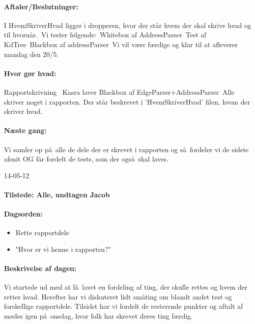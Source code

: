 \documentclass[a4paper,10pt,titlepage]{article}
\begin{document}
		\paragraph{Aftaler/Beslutninger:}
		I HvemSkriverHvad ligger i dropperen, hvor der st\aa r hvem der skal skrive hvad og til hvorn\aa r.\  
Vi tester f\o lgende:\
Whitebox af AddressParser\
Test af KdTree\
Blackbox af addressParser\
Vi vil v\ae re f\ae rdige og klar til at afleverer mandag den 20/5. 

		\paragraph{Hvor g\o r hvad:}
		Rapportskrivning \
Kasra laver Blackbox af EdgeParser+AddressParser\
Alle skriver noget i rapporten. Der st\aa r beskrevet i ’HvemSkriverHvad’ filen, hvem der skriver hvad. 

		\paragraph{N\ae ste gang:}
Vi samler op p\aa \ alle de dele der er skrevet i rapporten og s\aa \ fordeler vi de sidste afsnit  OG f\aa r fordelt de tests, som der ogs\aa \ skal laves.\mbox{}\\

\begin{center}
		14-05-12
		\end{center}
		
		\paragraph{Tilstede: Alle, undtagen Jacob}
		\paragraph{Dagsorden:}
		\begin{itemize}
					\item Rette rapportdele
					\item "Hvor er vi henne i rapporten?"
					
		\end{itemize}
		
		\paragraph{Beskrivelse af dagen:}
		Vi startede ud med at f\aa \ lavet en fordeling af ting, der skulle rettes og hvem der retter hvad. Herefter har vi diskuteret lidt sm\aa ting om blandt andet test og forskellige rapportdele. Tilsidst har vi fordelt de resterende punkter og aftalt af m\o des igen p\aa \ onsdag, hvor folk har skrevet deres ting f\ae rdig.
\end{document}
